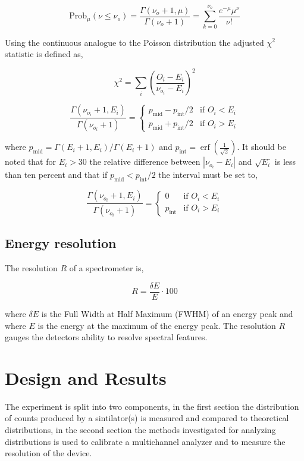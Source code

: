 \documentclass[%
 reprint,
 amsmath,amssymb,
 aps,
]{revtex4-1}
\begin{document}
\[
\text{Prob}_\mu\left(\nu \leq \nu_o\right)=\frac{\Gamma(\nu_o+1, \mu)}{\Gamma(\nu_o + 1)}=\sum_{k=0}^{\nu_o}\frac{e^{-\mu}\mu^\nu}{\nu!}
\]

Using the continuous analogue to the Poisson distribution the adjusted $\chi^2$ statistic is defined as,

\[
\chi^2 = \sum_i \left(\frac{O_i - E_i}{\nu_{o_i} - E_i}\right)^2
\]

\[
\frac{\Gamma(\nu_{o_i}+1, E_i)}{\Gamma(\nu_{o_i} + 1)} = \begin{cases}
p_\text{mid} - p_\text{int}/2 & \text{if $O_i < E_i$}\\
p_\text{mid} + p_\text{int}/2 & \text{if $O_i > E_i$}
\end{cases}
\]

where $p_\text{mid} = \Gamma(E_i+1, E_i)/\Gamma(E_i + 1)$ and $p_\text{int}=\operatorname{erf}({\frac{1}{\sqrt{2}}})$. It should be noted that for $E_i > 30$ the relative difference between $\left|\nu_{o_i}-E_i\right|$ and $\sqrt{E_i}$ is less than ten percent and that if $p_\text{mid} < p_\text{int}/2$ the interval must be set to,

\[
\frac{\Gamma(\nu_{o_i}+1, E_i)}{\Gamma(\nu_{o_i} + 1)} = \begin{cases}
0 & \text{if $O_i < E_i$}\\
p_\text{int} & \text{if $O_i > E_i$}
\end{cases}
\]

\subsection{Energy resolution}
The resolution $R$ of a spectrometer is,

\begin{equation}
R = \frac{\delta E}{E}\cdot100
\label{energy_resolution}
\end{equation}

where $\delta E$ is the Full Width at Half Maximum (FWHM) of an energy peak and where $E$ is the energy at the maximum of the energy peak. The resolution $R$ gauges the detectors ability to resolve spectral features.

\section{Design and Results}
The experiment is split into two components, in the first section the distribution of counts produced by a sintilator(s) is measured and compared to theoretical distributions, in the second section the methods investigated for analyzing distributions is used to calibrate a multichannel analyzer and  to measure the resolution of the device.
\end{document}
